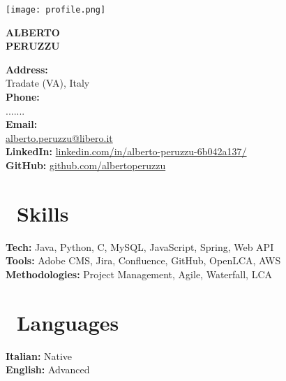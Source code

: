 \documentclass[a4paper,12pt]{article}
\begin{document}
\pagestyle{empty}

\begin{paracol}{2}


\begin{flushleft}
    \texttt{[image: profile.png]}
    \vspace{0.5cm}

    {\huge \textbf{ALBERTO}}\\
    \vspace{0.1cm}
    {\huge \textbf{PERUZZU}}\\
    \vspace{0.3cm}
    \begin{tcolorbox}[colback=Goldenrod, colframe=lightgray, boxrule=0pt, left=0mm, right=0mm, top=0mm, bottom=0mm, width=\linewidth, enlarge left by=0mm, enlarge right by=0mm]
    \raggedright
    \vspace{0.5cm}
    \textbf{Address:}\\Tradate (VA), Italy\\
    \textbf{Phone:}\\ .......\\
    \textbf{Email:}\\ \href{mailto:alberto.peruzzu@libero.it}{alberto.peruzzu@libero.it}\\
    \textbf{LinkedIn:} \href{https://www.linkedin.com/in/alberto-peruzzu-6b042a137/}{linkedin.com/in/alberto-peruzzu-6b042a137/}\\
    \textbf{GitHub:} \href{https://github.com/albertoperuzzu}{github.com/albertoperuzzu}

    \section{\faTags\ Skills}
    \begin{center}

      \parbox{\dimexpr\linewidth-2\fboxsep}{%
        \raggedright
        \textbf{Tech:} Java, Python, C, MySQL, JavaScript, Spring, Web API\\[0.2cm]
        \textbf{Tools:} Adobe CMS, Jira, Confluence, GitHub, OpenLCA, AWS\\[0.2cm]
        \textbf{Methodologies:} Project Management, Agile, Waterfall, LCA
      }%

    \end{center}

    \section{\faGlobe\ Languages}
    \textbf{Italian:} Native\\
    \textbf{English:} Advanced


\end{tcolorbox}
\end{flushleft}
\end{paracol}
\end{document}
